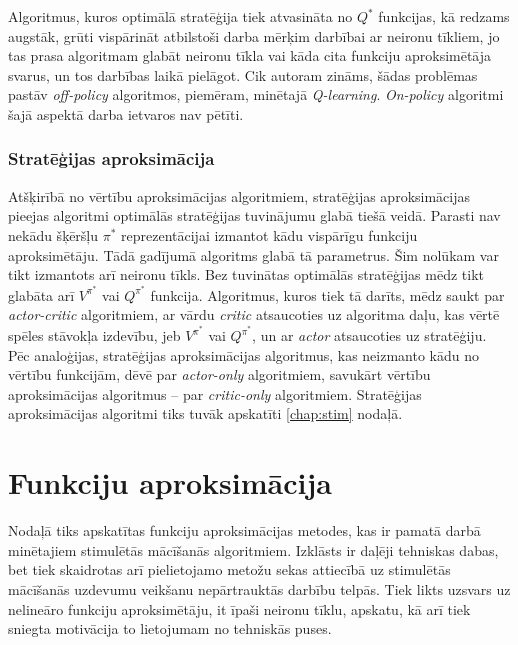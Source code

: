 \documentclass{ludis} %
\begin{document}
Algoritmus, kuros optimālā stratēģija tiek atvasināta no $Q^*$ funkcijas, kā
redzams augstāk, grūti vispārināt atbilstoši darba mērķim darbībai ar neironu
tīkliem, jo tas prasa algoritmam glabāt neironu tīkla vai kāda cita funkciju
aproksimētāja svarus, un tos darbības laikā pielāgot. Cik autoram zināms, šādas
problēmas pastāv \textit{off-policy} algoritmos, piemēram, minētajā
\textit{Q-learning}. \textit{On-policy} algoritmi šajā aspektā darba ietvaros
nav pētīti.

\subsection{Stratēģijas aproksimācija}
Atšķirībā no vērtību aproksimācijas algoritmiem, stratēģijas aproksimācijas
pieejas algoritmi optimālās stratēģijas tuvinājumu glabā tiešā veidā. Parasti
nav nekādu šķēršļu $\pi^*$ reprezentācijai izmantot kādu vispārīgu funkciju
aproksimētāju. Tādā gadījumā algoritms glabā tā parametrus. Šim nolūkam var tikt
izmantots arī neironu tīkls. Bez tuvinātas optimālās stratēģijas mēdz tikt
glabāta arī $V^{\pi^*}$ vai $Q^{\pi^*}$ funkcija. Algoritmus, kuros tiek tā
darīts, mēdz saukt par \textit{actor-critic} algoritmiem, ar vārdu
\textit{critic} atsaucoties uz algoritma daļu, kas vērtē spēles stāvokļa
izdevību, jeb $V^{\pi^*}$ vai $Q^{\pi^*}$, un ar \textit{actor} atsaucoties uz
stratēģiju. Pēc analoģijas, stratēģijas aproksimācijas algoritmus, kas neizmanto
kādu no vērtību funkcijām, dēvē par \textit{actor-only} algoritmiem, savukārt
vērtību aproksimācijas algoritmus -- par \textit{critic-only} algoritmiem.
Stratēģijas aproksimācijas algoritmi tiks tuvāk apskatīti \ref{chap:stim}
nodaļā.

\chapter{Funkciju aproksimācija}
Nodaļā tiks apskatītas funkciju aproksimācijas metodes, kas ir pamatā darbā
minētajiem stimulētās mācīšanās algoritmiem. Izklāsts ir daļēji tehniskas dabas,
bet tiek skaidrotas arī pielietojamo metožu sekas attiecībā uz stimulētās
mācīšanās uzdevumu veikšanu nepārtrauktās darbību telpās. Tiek likts uzsvars uz
nelineāro funkciju aproksimētāju, it īpaši neironu tīklu, apskatu, kā arī tiek
sniegta motivācija to lietojumam no tehniskās puses.
\end{document}
